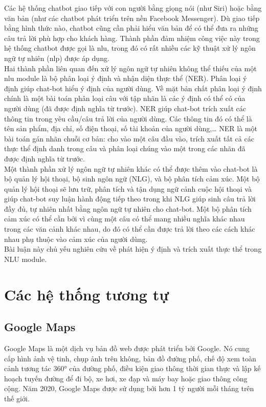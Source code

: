 Các hệ thống chatbot giao tiếp với con người bằng giọng nói (như Siri) hoặc bằng văn bản (như các chatbot phát triển trên nền Facebook Messenger). Dù giao tiếp bằng hình thức nào, chatbot cũng cần phải hiểu văn bản để có thể đưa ra những câu trả lời phù hợp cho khách hàng. Thành phần đảm nhiệm công việc này trong hệ thống chatbot được gọi là \ac{nlu}, trong đó có rất nhiều các kỹ thuật xử lý ngôn ngữ tự nhiên (\ac{nlp}) được áp dụng.
\\
Hai thành phần liên quan đến xử lý ngôn ngữ tự nhiên không thể thiếu của một \ac{nlu} module là bộ phân loại ý định và nhận diện thực thể (NER). Phân loại ý định giúp chat-bot hiểu ý định của người dùng. Về mặt bản chất phân loại ý định chính là một bài toán phân loại câu với tập nhãn là các ý định có thể có của người dùng (đã được định nghĩa từ trước). NER giúp chat-bot trích xuất các thông tin trong yêu cầu/câu trả lời của người dùng. Các thông tin đó có thể là tên sản phẩm, địa chỉ, số điện thoại, số tài khoản của người dùng,… NER là một bài toán gán nhãn chuỗi cơ bản: cho vào một câu đầu vào, trích xuất tất cả các thực thể định danh trong câu và phân loại chúng vào một trong các nhãn đã được định nghĩa từ trước.
\\
Một thành phần xử lý ngôn ngữ tự nhiên khác có thể được thêm vào chat-bot là bộ quản lý hội thoại, bộ sinh ngôn ngữ (NLG), và bộ phân tích cảm xúc. Một bộ quản lý hội thoại sẽ lưu trữ, phân tích và tận dụng ngữ cảnh cuộc hội thoại và giúp chat-bot suy luận hành động tiếp theo trong khi NLG giúp sinh câu trả lời đầy đủ, tự nhiên nhất bằng ngôn ngữ tự nhiên cho chat-bot. Một bộ phân tích cảm xúc có thể cần bởi vì cùng một câu có thể mang nhiều nghĩa khác nhau trong các văn cảnh khác nhau, do đó có thể cần được trả lời theo các cách khác nhau phụ thuộc vào cảm xúc của người dùng.
\\
Bài luận này chủ yếu nghiên cứu về phát hiện ý định và trích xuất thực thể trong NLU module.

\section{Các hệ thống tương tự}
\subsection{Google Maps}
Google Maps là một dịch vụ bản đồ web được phát triển bởi Google. Nó cung cấp hình ảnh vệ tinh, chụp ảnh trên không, bản đồ đường phố, chế độ xem toàn cảnh tương tác 360° của đường phố, điều kiện giao thông thời gian thực và lập kế hoạch tuyến đường để đi bộ, xe hơi, xe đạp và máy bay hoặc giao thông công cộng. Năm 2020, Google Maps được sử dụng bởi hơn 1 tỷ người mỗi tháng trên thế giới.

